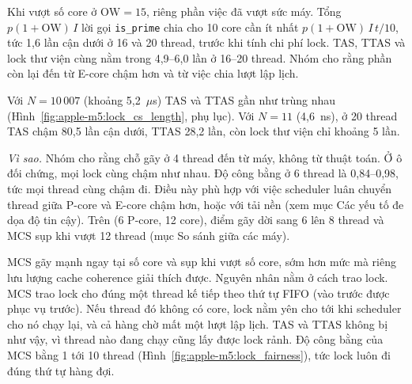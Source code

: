 Khi vượt số core ở $\mathrm{OW} = 15$, riêng phần việc đã vượt sức máy. Tổng $p(1+\mathrm{OW})\,I$ lời
gọi \texttt{is\_prime} chia cho 10 core cần ít nhất $p(1+\mathrm{OW})\,I\,t/10$, tức 1,6 lần cận dưới ở
16 và 20 thread, trước khi tính chi phí lock. TAS, TTAS và lock thư viện cùng nằm trong 4,9--6,0 lần ở
16--20 thread. Nhóm cho rằng phần còn lại đến từ E-core chậm hơn và từ việc chia lượt lập lịch.

Với $N = 10\,007$ (khoảng 5,2~$\mu$s) TAS và TTAS gần như trùng nhau
(Hình~\ref{fig:apple-m5:lock_cs_length}, phụ lục). Với $N = 11$ (4,6~ns), ở 20 thread TAS chậm 80,5 lần cận
dưới, TTAS 28,2 lần, còn lock thư viện chỉ khoảng 5 lần.

\emph{Vì sao.} Nhóm cho rằng chỗ gãy ở 4 thread đến từ máy, không từ thuật toán. Ở ô đối chứng, mọi
lock cùng chậm như nhau. Độ công bằng ở 6 thread là 0,84--0,98, tức mọi thread cùng chậm đi. Điều này
phù hợp với việc scheduler luân chuyển thread giữa P-core và E-core chậm hơn, hoặc với tải nền (xem mục
Các yếu tố đe dọa độ tin cậy). Trên  (6 P-core, 12 core), điểm gãy dời sang 6 lên 8
thread và MCS sụp khi vượt 12 thread (mục So sánh giữa các máy).

MCS gãy mạnh ngay tại số core và sụp khi vượt số core, sớm hơn mức mà riêng lưu lượng cache coherence
giải thích được. Nguyên nhân nằm ở cách trao lock. MCS trao lock cho đúng một thread kế tiếp theo thứ tự FIFO (vào trước được phục
vụ trước). Nếu thread đó không có core, lock nằm yên cho tới khi scheduler cho nó chạy lại, và cả hàng
chờ mất một lượt lập lịch. TAS và TTAS không bị như vậy, vì thread nào đang chạy cũng lấy được lock
rảnh. Độ công bằng của MCS bằng 1 tới 10 thread (Hình~\ref{fig:apple-m5:lock_fairness}), tức lock luôn
đi đúng thứ tự hàng đợi.


